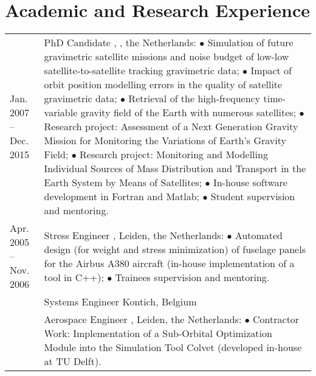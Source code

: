 \documentclass[a4paper]{article}
\newcommand{\dynhref}[2]{%
  \iftoggle{expliciturl}{%
    #2 (\href{#1}{\texttt{\detokenize{#1}}})%
  }{%
    \href{#1}{#2}%
  }%
}
\newcommand{\procv}[2]{\iftoggle{professionalcv}{#1}{#2}}
\newlength{\listskipbig}
\newenvironment{cvsection}[2]{
  \setlength{\floatsep}{0pt}
  \setlength{\textfloatsep}{0pt}
  \setlength{\intextsep}{0pt}
  \section*{#1}
  \begin{longtable}{lp{#2}}
}{
  \end{longtable}
}
\begin{document}
\begin{cvsection}{Academic and Research Experience}{11.0cm}
Jan. 2007 -- Dec. 2015
  & PhD Candidate\newline
    \dynhref{http://tinyurl.com/GRS-TUDelft}{Geoscience \& Remote Sensing}, \dynhref{http://www.tudelft.nl/}{Delft University of Technology}, the Netherlands:\newline
    $\bullet$ Simulation of future gravimetric satellite missions and noise budget of low-low satellite-to-satellite tracking gravimetric data;\newline
    $\bullet$ Impact of orbit position modelling errors in the quality of satellite gravimetric data;\newline
    $\bullet$ Retrieval of the high-frequency time-variable gravity field of the Earth with numerous satellites;\newline
    $\bullet$ Research project: Assessment of a Next Generation Gravity Mission for Monitoring the Variations of Earth's Gravity Field;\newline
    $\bullet$ Research project: Monitoring and Modelling Individual Sources of Mass Distribution and Transport in the Earth System by Means of Satellites;\newline
    $\bullet$ In-house software development in Fortran and Matlab;\newline
    $\bullet$ Student supervision and mentoring.
    \\[\listskipbig]


Apr. 2005 -- Nov. 2006
  & Stress Engineer\newline
    \dynhref{http://www.globaltechnics.nl/}{Global Technics}, Leiden, the Netherlands:\newline
    $\bullet$ Automated design (for weight and stress minimization) of fuselage panels for the Airbus A380 aircraft (in-house implementation of a tool in C++);\newline
    $\bullet$ Trainees supervision and mentoring.
    \\[\listskipbig]

\procv{
6/2005 -- 7/2005 & Systems Engineer \newline
                 \dynhref{http://www.reduct.net}{Reduct}\newline
                   Kontich, Belgium\\[\listskipbig]
}{}

Oct. 2004 -- Jan. 2005
  & Aerospace Engineer\newline
    \dynhref{http://www.delta-utec.com/}{Delta-Utec}, Leiden, the Netherlands:\newline
      $\bullet$ Contractor Work: Implementation of a Sub-Orbital Optimization Module into the Simulation Tool Colvet (developed in-house at TU Delft).
    \\[\listskipbig]


\end{cvsection}
\end{document}
